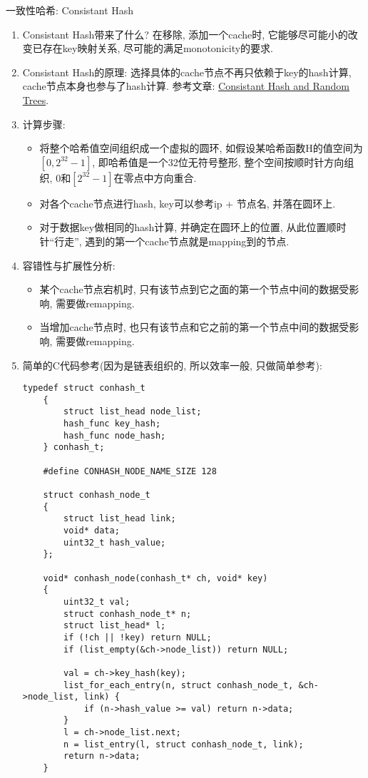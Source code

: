 \vspace {10pt}
{ \ZHH 一致性哈希: Consistant Hash }
\begin {enumerate}
    \item { Consistant Hash带来了什么? 在移除, 添加一个cache时, 它能够尽可能小的改变已存在key映射关系, 尽可能的满足monotonicity的要求. }
    \item { Consistant Hash的原理: 选择具体的cache节点不再只依赖于key的hash计算, cache节点本身也参与了hash计算. 参考文章: \href{http://www.akamai.com/dl/technical_publications/ConsistenHashingandRandomTreesDistributedCachingprotocolsforrelievingHotSpotsontheworldwideweb.pdf}{Consistant Hash and Random Trees}. }
    \item { 计算步骤: }
        \begin {itemize}
        \item { 将整个哈希值空间组织成一个虚拟的圆环, 如假设某哈希函数H的值空间为$[0, 2^{32}-1]$, 即哈希值是一个32位无符号整形, 整个空间按顺时针方向组织, 0和$[2^{32}-1]$在零点中方向重合. }
        \item { 对各个cache节点进行hash, key可以参考ip + 节点名, 并落在圆环上. }
        \item { 对于数据key做相同的hash计算, 并确定在圆环上的位置, 从此位置顺时针“行走”, 遇到的第一个cache节点就是mapping到的节点. }
        \end {itemize}
    \item { 容错性与扩展性分析: }
        \begin {itemize}
        \item { 某个cache节点宕机时, 只有该节点到它之面的第一个节点中间的数据受影响, 需要做remapping. }
        \item { 当增加cache节点时, 也只有该节点和它之前的第一个节点中间的数据受影响, 需要做remapping. }
        \end {itemize}
    \item { 简单的C代码参考(因为是链表组织的, 所以效率一般, 只做简单参考): }
    \begin{lstlisting}[language={[ANSI]C}]
    typedef struct conhash_t
    {
        struct list_head node_list;
        hash_func key_hash;
        hash_func node_hash;
    } conhash_t;

    #define CONHASH_NODE_NAME_SIZE 128

    struct conhash_node_t
    {
        struct list_head link;
        void* data;
        uint32_t hash_value;
    };

    void* conhash_node(conhash_t* ch, void* key)
    {
        uint32_t val;
        struct conhash_node_t* n;
        struct list_head* l;
        if (!ch || !key) return NULL;
        if (list_empty(&ch->node_list)) return NULL;

        val = ch->key_hash(key);
        list_for_each_entry(n, struct conhash_node_t, &ch->node_list, link) {
            if (n->hash_value >= val) return n->data;
        }
        l = ch->node_list.next;
        n = list_entry(l, struct conhash_node_t, link);
        return n->data;
    }
    \end{lstlisting}
\end {enumerate}


